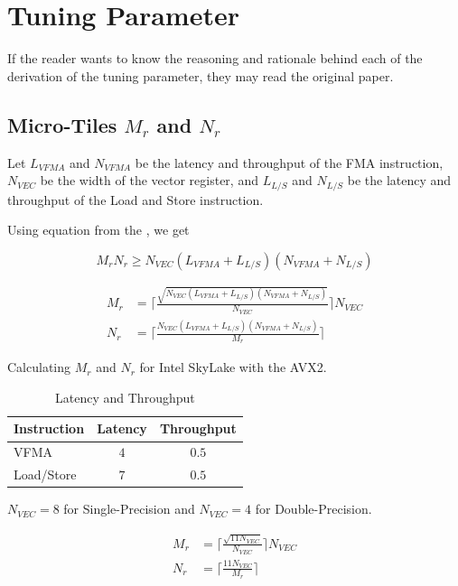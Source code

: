 \section{Tuning Parameter}

If the reader wants to know the reasoning and rationale 
behind each of the derivation of the tuning parameter, 
they may read the original \cite{BLIS} paper.

\subsection{Micro-Tiles $M_r$ and $N_r$}

Let $L_{VFMA}$ and $N_{VFMA}$ be the latency and throughput of the FMA instruction, 
$N_{VEC}$ be the width of the vector register, and
$L_{L/S}$ and $N_{L/S}$ be the latency and throughput of 
the Load and Store instruction.

Using equation from the \cite{BLIS}, we get

\begin{equation}
    M_rN_r \geq N_{VEC} (L_{VFMA} + L_{L/S}) (N_{VFMA} + N_{L/S})
\end{equation}

\begin{align*}
    M_r &= \lceil \frac{ \sqrt{N_{VEC} (L_{VFMA} + L_{L/S}) (N_{VFMA} + N_{L/S})} }{N_{VEC}} \rceil N_{VEC} \\
    N_r &= \lceil \frac{ N_{VEC} (L_{VFMA} + L_{L/S}) (N_{VFMA} + N_{L/S}) }{M_r} \rceil
\end{align*}


Calculating $M_r$ and $N_r$ for Intel SkyLake with the AVX2.

\begin{table}[ht]
    \centering
    \caption{Latency and Throughput}
    \begin{tabular}{|l|c|c|}
        \hline
        \textbf{Instruction} & \textbf{Latency} & \textbf{Throughput}\\
        \hline
        VFMA        & $4$ & $0.5$ \\
        \hline
        Load/Store  & $7$ & $0.5$ \\
        \hline
    \end{tabular}
\end{table}

$N_{VEC} = 8$ for Single-Precision and $N_{VEC} = 4$ for Double-Precision.

\begin{align*}
    M_r &= \lceil \frac{ \sqrt{11 N_{VEC}} }{N_{VEC}} \rceil N_{VEC} \\
    N_r &= \lceil \frac{ 11 N_{VEC} }{M_r} \rceil
\end{align*}

